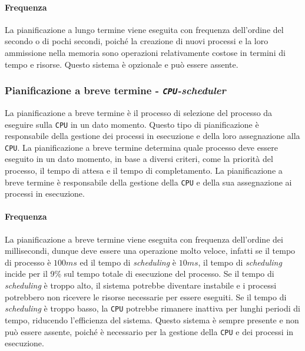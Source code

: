         \paragraph{Frequenza} La pianificazione a lungo termine viene eseguita con frequenza dell'ordine del secondo o di pochi secondi, poiché la creazione di nuovi processi e la loro ammissione nella memoria sono operazioni relativamente costose in termini di tempo e risorse.\newline
        Questo sistema è opzionale e può essere assente.
    \subsubsection{Pianificazione a breve termine - \textit{\texttt{CPU}-scheduler}}
        La pianificazione a breve termine è il processo di selezione del processo da eseguire sulla \texttt{CPU} in un dato momento. Questo tipo di pianificazione è responsabile della gestione dei processi in esecuzione e della loro assegnazione alla \texttt{CPU}. La pianificazione a breve termine determina quale processo deve essere eseguito in un dato momento, in base a diversi criteri, come la priorità del processo, il tempo di attesa e il tempo di completamento. La pianificazione a breve termine è responsabile della gestione della \texttt{CPU} e della sua assegnazione ai processi in esecuzione.
        \paragraph{Frequenza} La pianificazione a breve termine viene eseguita con frequenza dell'ordine dei millisecondi, dunque deve essere una operazione molto veloce, infatti se il tempo di processo è $100ms$ ed il tempo di \textit{scheduling} è $10ms$, il tempo di \textit{scheduling} incide per il 9\% sul tempo totale di esecuzione del processo. Se il tempo di \textit{scheduling} è troppo alto, il sistema potrebbe diventare instabile e i processi potrebbero non ricevere le risorse necessarie per essere eseguiti. Se il tempo di \textit{scheduling} è troppo basso, la \texttt{CPU} potrebbe rimanere inattiva per lunghi periodi di tempo, riducendo l'efficienza del sistema.\newline
        Questo sistema è sempre presente e non può essere assente, poiché è necessario per la gestione della \texttt{CPU} e dei processi in esecuzione.

